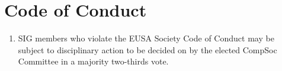 \section{Code of Conduct}
\begin{enumerate}
\item SIG members who violate the EUSA Society Code of Conduct may be subject to disciplinary action to be decided on by the elected CompSoc Committee in a majority two-thirds vote.
\end{enumerate}